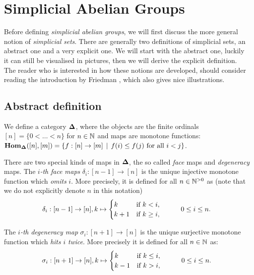\section{Simplicial Abelian Groups}
\label{sec:Simplicial Abelian Groups}

Before defining \emph{simplicial abelian groups}, we will first discuss the more general notion of \emph{simplicial sets}. There are generally two definitions of simplicial sets, an abstract one and a very explicit one. We will start with the abstract one, luckily it can still be visualised in pictures, then we will derive the explicit definition. The reader who is interested in how these notions are developed, should consider reading the introduction by Friedman \cite{friedman}, which also gives nice illustrations.

\subsection{Abstract definition}
\begin{definition}
	We define a category $\mathbf{\Delta}$, where the objects are the finite ordinals $[n] = \{0 < \dots < n\}$ for $n \in \mathbb{N}$ and maps are monotone functions: $\mathbf{Hom}_{\mathbf{\Delta}}([n], [m]) = \{ f : [n] \to [m] \,\mid\, f(i) \leq f(j) \text{ for all } i < j \}$.
\end{definition}

There are two special kinds of maps in $\mathbf{\Delta}$, the so called \emph{face} maps and \emph{degeneracy} maps. The \emph{$i$-th face maps} $\delta_i: [n-1] \to [n]$ is the unique injective monotone function which \emph{omits} $i$. More precisely, it is defined for all $n \in {\mathbb{N}^{>0}}$ as (note that we do not explicitly denote $n$ in this notation)
$$ \delta_i: [n-1] \to [n], k \mapsto \begin{cases} k & \text{if } k < i,\\ k+1 & \text{if } k \geq i, \end{cases} \hspace{1.0cm} 0 \leq i \leq n. $$

The \emph{$i$-th degeneracy map} $\sigma_i: [n+1] \to [n]$ is the unique surjective monotone function which \emph{hits $i$ twice}. More precisely it is defined for all $n \in \mathbb{N}$ as:
$$ \sigma_i: [n+1] \to [n], k \mapsto \begin{cases} k & \text{if } k \leq i,\\ k-1 & \text{if } k > i, \end{cases} \hspace{1.0cm} 0 \leq i \leq n. $$

